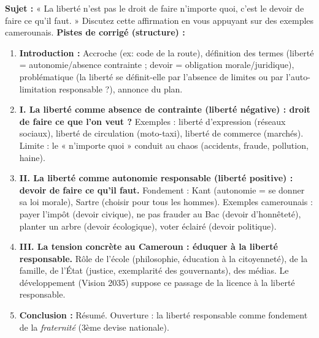 \documentclass[11pt]{article}
\begin{document}
\begin{exercice}
\textbf{Sujet :} « La liberté n'est pas le droit de faire n'importe quoi, c'est le devoir de faire ce qu'il faut. » Discutez cette affirmation en vous appuyant sur des exemples camerounais.
\textbf{Pistes de corrigé (structure) :}
\begin{enumerate}
    \item \textbf{Introduction :} Accroche (ex: code de la route), définition des termes (liberté = autonomie/absence contrainte ; devoir = obligation morale/juridique), problématique (la liberté se définit-elle par l'absence de limites ou par l'auto-limitation responsable ?), annonce du plan.
    \item \textbf{I. La liberté comme absence de contrainte (liberté négative) : droit de faire ce que l'on veut ?} Exemples : liberté d'expression (réseaux sociaux), liberté de circulation (moto-taxi), liberté de commerce (marchés). Limite : le « n'importe quoi » conduit au chaos (accidents, fraude, pollution, haine).
    \item \textbf{II. La liberté comme autonomie responsable (liberté positive) : devoir de faire ce qu'il faut.} Fondement : Kant (autonomie = se donner sa loi morale), Sartre (choisir pour tous les hommes). Exemples camerounais : payer l'impôt (devoir civique), ne pas frauder au Bac (devoir d'honnêteté), planter un arbre (devoir écologique), voter éclairé (devoir politique).
    \item \textbf{III. La tension concrète au Cameroun : éduquer à la liberté responsable.} Rôle de l'école (philosophie, éducation à la citoyenneté), de la famille, de l'État (justice, exemplarité des gouvernants), des médias. Le développement (Vision 2035) suppose ce passage de la licence à la liberté responsable.
    \item \textbf{Conclusion :} Résumé. Ouverture : la liberté responsable comme fondement de la \emph{fraternité} (3ème devise nationale).
\end{enumerate}
\end{exercice}
\end{document}
